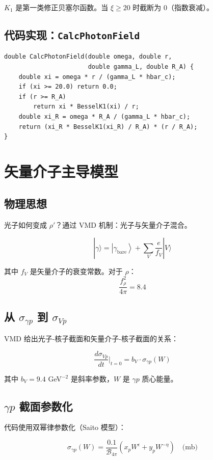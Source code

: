 \documentclass[11pt,a4paper,UTF8]{ctexart}
\begin{document}
$K_1$ 是第一类修正贝塞尔函数。当 $\xi \ge 20$ 时截断为 0（指数衰减）。

\subsection{代码实现：\texttt{CalcPhotonField}}

\begin{verbatim}
double CalcPhotonField(double omega, double r, 
                       double gamma_L, double R_A) {
    double xi = omega * r / (gamma_L * hbar_c);
    if (xi >= 20.0) return 0.0;
    if (r >= R_A) 
        return xi * BesselK1(xi) / r;
    double xi_R = omega * R_A / (gamma_L * hbar_c);
    return (xi_R * BesselK1(xi_R) / R_A) * (r / R_A);
}
\end{verbatim}

\section{矢量介子主导模型}

\subsection{物理思想}

光子如何变成 $\rho'$？通过 VMD 机制：光子与矢量介子混合。

\[
|\gamma\rangle = \left| \gamma_{\text{bare}} \right\rangle + \sum_V \frac{e}{f_V} |V\rangle
\]

其中 $f_V$ 是矢量介子的衰变常数。对于 $\rho$：
\[
\frac{f_\rho^2}{4\pi} = 8.4
\]

\subsection{从 $\sigma_{\gamma p}$ 到 $\sigma_{Vp}$}

VMD 给出光子-核子截面和矢量介子-核子截面的关系：

\[
\frac{d\sigma_{Vp}}{dt}\bigg|_{t=0} = b_V \cdot \sigma_{\gamma p}(W)
\]

其中 $b_V = 9.4$ GeV$^{-2}$ 是斜率参数，$W$ 是 $\gamma p$ 质心能量。

\subsection{$\gamma p$ 截面参数化}

代码使用双幂律参数化（Saito 模型）：

\[
\sigma_{\gamma p}(W) = \frac{0.1}{\mathcal{B}_{4\pi}} \left( x_p W^\epsilon + y_p W^{-\eta} \right) \quad \text{(mb)}
\]
\end{document}
